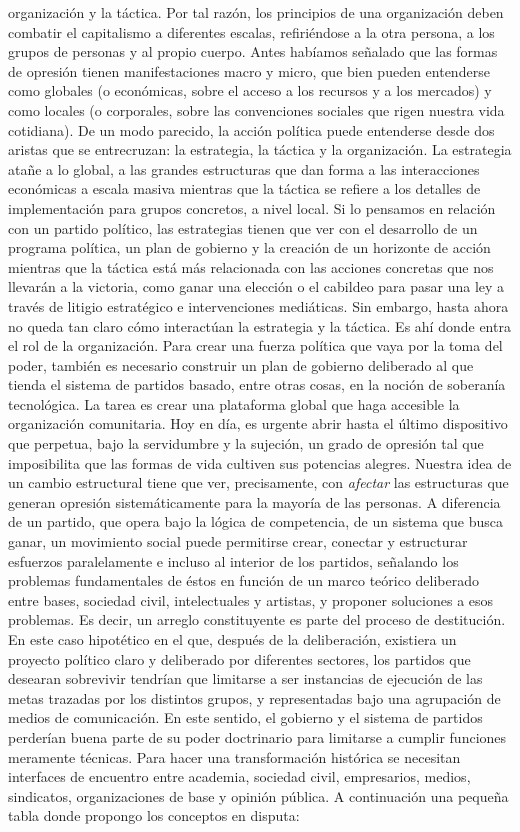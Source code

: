 \documentclass[
]{article}
\begin{document}
organización y la táctica. Por tal razón, los principios de una
organización deben combatir el capitalismo a diferentes escalas,
refiriéndose a la otra persona, a los grupos de personas y al propio
cuerpo. Antes habíamos señalado que las formas de opresión tienen
manifestaciones macro y micro, que bien pueden entenderse como globales
(o económicas, sobre el acceso a los recursos y a los mercados) y como
locales (o corporales, sobre las convenciones sociales que rigen nuestra
vida cotidiana). De un modo parecido, la acción política puede
entenderse desde dos aristas que se entrecruzan: la estrategia, la
táctica y la organización. La estrategia atañe a lo global, a las
grandes estructuras que dan forma a las interacciones económicas a
escala masiva mientras que la táctica se refiere a los detalles de
implementación para grupos concretos, a nivel local. Si lo pensamos en
relación con un partido político, las estrategias tienen que ver con el
desarrollo de un programa política, un plan de gobierno y la creación de
un horizonte de acción mientras que la táctica está más relacionada con
las acciones concretas que nos llevarán a la victoria, como ganar una
elección o el cabildeo para pasar una ley a través de litigio
estratégico e intervenciones mediáticas. Sin embargo, hasta ahora no
queda tan claro cómo interactúan la estrategia y la táctica. Es ahí
donde entra el rol de la organización. Para crear una fuerza política
que vaya por la toma del poder, también es necesario construir un plan
de gobierno deliberado al que tienda el sistema de partidos basado,
entre otras cosas, en la noción de soberanía tecnológica. La tarea es
crear una plataforma global que haga accesible la organización
comunitaria. Hoy en día, es urgente abrir hasta el último dispositivo
que perpetua, bajo la servidumbre y la sujeción, un grado de opresión
tal que imposibilita que las formas de vida cultiven sus potencias
alegres. Nuestra idea de un cambio estructural tiene que ver,
precisamente, con \emph{afectar} las estructuras que generan opresión
sistemáticamente para la mayoría de las personas. A diferencia de un
partido, que opera bajo la lógica de competencia, de un sistema que
busca ganar, un movimiento social puede permitirse crear, conectar y
estructurar esfuerzos paralelamente e incluso al interior de los
partidos, señalando los problemas fundamentales de éstos en función de
un marco teórico deliberado entre bases, sociedad civil, intelectuales y
artistas, y proponer soluciones a esos problemas. Es decir, un arreglo
constituyente es parte del proceso de destitución. En este caso
hipotético en el que, después de la deliberación, existiera un proyecto
político claro y deliberado por diferentes sectores, los partidos que
desearan sobrevivir tendrían que limitarse a ser instancias de ejecución
de las metas trazadas por los distintos grupos, y representadas bajo una
agrupación de medios de comunicación. En este sentido, el gobierno y el
sistema de partidos perderían buena parte de su poder doctrinario para
limitarse a cumplir funciones meramente técnicas. Para hacer una
transformación histórica se necesitan interfaces de encuentro entre
academia, sociedad civil, empresarios, medios, sindicatos,
organizaciones de base y opinión pública. A continuación una pequeña
tabla donde propongo los conceptos en disputa:
\end{document}

